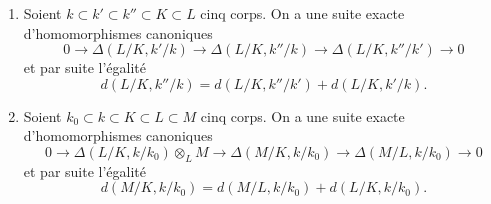 \begin{proposition}[21.6.4]
\label{0.21.6.4-fr}
\begin{enumerate}
  \item[\rm (i)] Soient $k\subset k'\subset k''\subset K\subset L$ cinq corps.
  On a une suite exacte d'homomorphismes canoniques
\begin{equation}
\tag{21.6.4.1}
\label{0.21.6.4.1-fr}
0\to\Delta(L/K,k'/k)\to\Delta(L/K,k''/k)\to\Delta(L/K,k''/k')\to0
\end{equation}
et par suite l'égalité
\begin{equation}
\tag{21.6.4.2}
\label{0.21.6.4.2-fr}
d(L/K,k''/k)=d(L/K,k''/k')+d(L/K,k'/k).
\end{equation}
  \item[\rm (ii)] Soient $k_0\subset k\subset K\subset L\subset M$ cinq corps.
  On a une suite exacte d'homomorphismes canoniques
\begin{equation}
\tag{21.6.4.3}
\label{0.21.6.4.3-fr}
0\to\Delta(L/K,k/k_0)\otimes_LM\to\Delta(M/K,k/k_0)
\to\Delta(M/L,k/k_0)\to0
\end{equation}
et par suite l'égalité
\begin{equation}
\tag{21.6.4.4}
\label{0.21.6.4.4-fr}
d(M/K,k/k_0)=d(M/L,k/k_0)+d(L/K,k/k_0).
\end{equation}
\end{enumerate}
\end{proposition}

